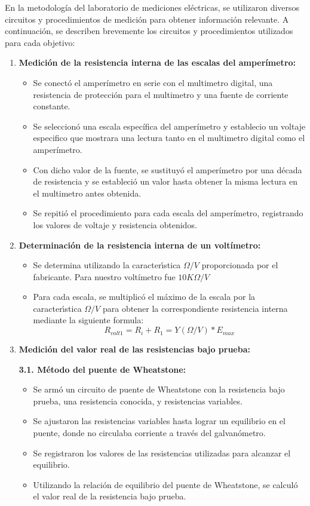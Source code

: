 \documentclass[12pt]{article}
\begin{document}
	En la metodología del laboratorio de mediciones eléctricas, se utilizaron diversos circuitos y procedimientos de medición para obtener información relevante. A continuación, se describen brevemente los circuitos y procedimientos utilizados para cada objetivo:\\
	
	\begin{enumerate}
		\item \textbf{Medición de la resistencia interna de las escalas del amperímetro:}
		
		\begin{itemize}
			\item Se conectó el amperímetro en serie con el multimetro digital, una resistencia de protección para el multimetro y una fuente de corriente constante.
			\item Se seleccionó una escala específica del amperímetro y establecio un voltaje especifico que mostrara una lectura tanto en el multimetro digital como el amperímetro.
			\item Con dicho valor de la fuente, se sustituyó el amperímetro por una década de resistencia y se estableció un valor hasta obtener la misma lectura en el multimetro antes obtenida. 
			\item Se repitió el procedimiento para cada escala del amperímetro, registrando los valores de voltaje y resistencia obtenidos.
		\end{itemize}
		
		\item \textbf{Determinación de la resistencia interna de un voltímetro:}
		
		\begin{itemize}
			\item Se determina utilizando la caracterı́stica $\Omega/V$ proporcionada por el fabricante. Para nuestro voltímetro fue $10K\Omega/V$
			\item Para cada escala, se multiplicó el máximo de la
			escala por la caracterı́stica $\Omega/V$ para obtener la correspondiente resistencia interna mediante la siguiente formula: $$R_{volt1} = R_{i} + R_{1} = Y(\Omega/V) * E_{max}$$ 
		\end{itemize}
		
		\item \textbf{Medición del valor real de las resistencias bajo prueba:}
		
		\textbf{3.1. Método del puente de Wheatstone:}
		
		\begin{itemize}
			\item Se armó un circuito de puente de Wheatstone con la resistencia bajo prueba, una resistencia conocida, y resistencias variables.
			\item Se ajustaron las resistencias variables hasta lograr un equilibrio en el puente, donde no circulaba corriente a través del galvanómetro.
			\item Se registraron los valores de las resistencias utilizadas para alcanzar el equilibrio.
			\item Utilizando la relación de equilibrio del puente de Wheatstone, se calculó el valor real de la resistencia bajo prueba.
		\end{itemize}
		

\end{enumerate}
\end{document}
